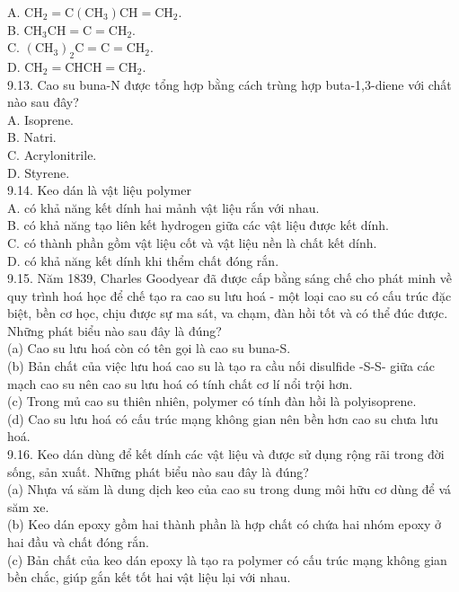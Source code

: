 \documentclass[10pt]{article}
\begin{document}
A. $\mathrm{CH}_{2}=\mathrm{C}\left(\mathrm{CH}_{3}\right) \mathrm{CH}=\mathrm{CH}_{2}$.\\
B. $\mathrm{CH}_{3} \mathrm{CH}=\mathrm{C}=\mathrm{CH}_{2}$.\\
C. $\left(\mathrm{CH}_{3}\right)_{2} \mathrm{C}=\mathrm{C}=\mathrm{CH}_{2}$.\\
D. $\mathrm{CH}_{2}=\mathrm{CHCH}=\mathrm{CH}_{2}$.\\
9.13. Cao su buna-N được tổng hợp bằng cách trùng hợp buta-1,3-diene với chất nào sau đây?\\
A. Isoprene.\\
B. Natri.\\
C. Acrylonitrile.\\
D. Styrene.\\
9.14. Keo dán là vật liệu polymer\\
A. có khả năng kết dính hai mảnh vật liệu rắn với nhau.\\
B. có khả năng tạo liên kết hydrogen giữa các vật liệu được kết dính.\\
C. có thành phần gồm vật liệu cốt và vật liệu nền là chất kết dính.\\
D. có khả năng kết dính khi thểm chất đóng rắn.\\
9.15. Năm 1839, Charles Goodyear đã được cấp bằng sáng chế cho phát minh về quy trình hoá học để chế tạo ra cao su lưu hoá - một loại cao su có cấu trúc đặc biệt, bền cơ học, chịu được sự ma sát, va chạm, đàn hồi tốt và có thể đúc được. Những phát biểu nào sau đây là đúng?\\
(a) Cao su lưu hoá còn có tên gọi là cao su buna-S.\\
(b) Bản chất của việc lưu hoá cao su là tạo ra cầu nối disulfide -S-S- giữa các mạch cao su nên cao su lưu hoá có tính chất cơ lí nổi trội hơn.\\
(c) Trong mủ cao su thiên nhiên, polymer có tính đàn hồi là polyisoprene.\\
(d) Cao su lưu hoá có cấu trúc mạng không gian nên bền hơn cao su chưa lưu hoá.\\
9.16. Keo dán dùng để kết dính các vật liệu và được sử dụng rộng rãi trong đời sống, sản xuất. Những phát biểu nào sau đây là đúng?\\
(a) Nhựa vá săm là dung dịch keo của cao su trong dung môi hữu cơ dùng để vá săm xe.\\
(b) Keo dán epoxy gồm hai thành phần là hợp chất có chứa hai nhóm epoxy ở hai đầu và chất đóng rắn.\\
(c) Bản chất của keo dán epoxy là tạo ra polymer có cấu trúc mạng không gian bền chắc, giúp gắn kết tốt hai vật liệu lại với nhau.\\
\end{document}
